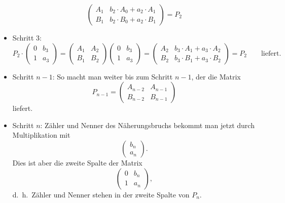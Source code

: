 \begin{itemize}
\begin{equation*}
\begin{pmatrix}
				A_1& b_2 \cdot A_0 + a_2 \cdot A_1\\
				B_1& b_2 \cdot B_0 + a_2 \cdot B_1
			\end{pmatrix}
		= 	P_2
\end{equation*}
\item Schritt 3:
\begin{equation*}
P_2 \cdot	\begin{pmatrix}
				0& b_3\\
				1& a_3
			\end{pmatrix}
		=	\begin{pmatrix}
				A_1& A_2\\
				B_1& B_2
			\end{pmatrix}
			\begin{pmatrix}
				0& b_3\\
				1& a_3
			\end{pmatrix}
		=	\begin{pmatrix}
				A_2& b_3 \cdot A_1 + a_3 \cdot A_2\\
				B_2& b_3 \cdot B_1 + a_3 \cdot B_2
			\end{pmatrix}
		= 	P_2 \qquad \text{liefert.}
\end{equation*}
\item Schritt $n-1$:
So macht man weiter bis zum Schritt $n-1$, der die Matrix
\begin{equation*}
P_{n-1} = 	\begin{pmatrix}
				A_{n-2}& A_{n-1}\\
				B_{n-2}& B_{n-1}			
			\end{pmatrix}
\end{equation*}
liefert.
\item Schritt $n$:
Zähler und Nenner des Näherungsbruchs bekommt man jetzt durch Multiplikation
mit 
\[
\begin{pmatrix}
b_n\\
a_n
\end{pmatrix}.
\]
Dies ist aber die zweite Spalte der Matrix
\[
\begin{pmatrix}
0& b_n\\
1& a_n
\end{pmatrix},
\]
d.~h.~Zähler und Nenner stehen in der zweite Spalte von $P_n$.
\end{itemize}

